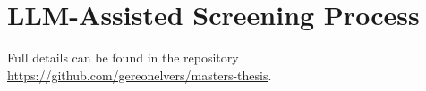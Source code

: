 \section{LLM-Assisted Screening Process}
\label{appendix:screening}
Full details can be found in the repository \url{https://github.com/gereonelvers/masters-thesis}.